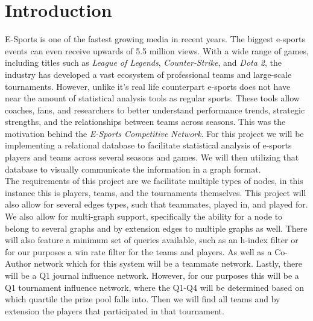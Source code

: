 \documentclass[sigconf]{acmart}
\begin{document}


\maketitle

\section{Introduction}
E-Sports is one of the fastest growing media in recent years. The biggest e-sports events can even receive upwards of 5.5 million views. With a wide range of games, including titles such as \textit{League of Legends}, \textit{Counter-Strike}, and \textit{Dota 2}, the industry has developed a vast ecosystem of professional teams and large-scale tournaments. However, unlike it's real life counterpart e-sports does not have near the amount of statistical analysis tools as regular sports. These tools allow coaches, fans, and researchers to better understand performance trends, strategic strengths, and the relationships between teams across seasons. This was the motivation behind the \textit{E-Sports Competitive Network}. For this project we will be implementing a relational database to facilitate statistical analysis of e-sports players and teams across several seasons and games. We will then utilizing that database to visually communicate the information in a graph format.\\
The requirements of this project are we facilitate multiple types of nodes, in this instance this is players, teams, and the tournaments themselves. This project will also allow for several edges types, such that teammates, played in, and played for. We also allow for multi-graph support, specifically the ability for a node to belong to several graphs and by extension edges to multiple graphs as well. There will also feature a minimum set of queries available, such as an h-index filter or for our purposes a win rate filter for the teams and players. As well as a Co-Author network which for this system will be a teammate network.  Lastly, there will be a Q1 journal influence network. However, for our purposes this will be a Q1 tournament influence network, where the Q1-Q4 will be determined based on which quartile the prize pool falls into. Then we will find all teams and by extension the players that participated in that tournament.
\end{document}
